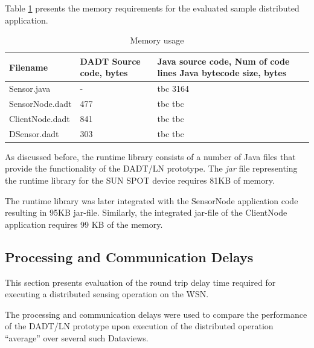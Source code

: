 Table \ref{Tab:Memory} presents the memory requirements for the evaluated sample
distributed application.

\begin{table}

	\begin{center}
	\begin{tabular}{| p{1.8cm} | p{1.8cm} | p{1.8cm} |}
	\hline
	
	Filename & DADT Source code, bytes  & Java source code, Num of
	code lines Java bytecode size, bytes \\ \hline 
	
	Sensor.java & -  & tbc  3164 \\ \hline
	SensorNode.dadt \T \B & 477 \T \B & tbc \T \B tbc \\ \hline
	ClientNode.dadt \T \B & 841 \T \B & tbc \T \B tbc \\ \hline
	DSensor.dadt \T \B & 303 \T \B & tbc \T \B tbc \\ \hline
	\end{tabular}
	\end{center}
	\caption{Memory usage}
	\label{Tab:Memory}
\end{table}

As discussed before, the runtime library consists of a number
of Java files that provide the functionality of the DADT/LN prototype. The \emph{jar} file representing the runtime
library for the SUN SPOT device requires 81KB of memory. 

The runtime library was later integrated with the SensorNode application code 
resulting in 95KB jar-file. Similarly, the integrated jar-file of the ClientNode
application requires 99 KB of the memory.

\subsection{Processing and Communication Delays}

This section presents evaluation of the round trip delay time required for
executing a distributed sensing operation on the WSN.  


The processing and communication delays were used to compare the performance of
the DADT/LN prototype upon execution of the distributed operation ``average''
over several such Dataviews. %

